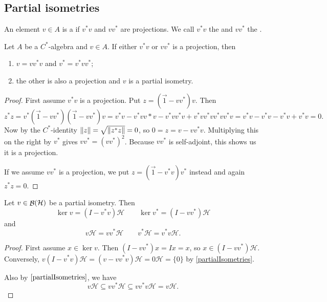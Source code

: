\subsection{Partial isometries}
\begin{definition}
An element $v\in A$ is a  if $v^*v$ and $vv^*$ are projections. We call $v^*v$ the  and $vv^*$ the .
\end{definition}
\begin{lemma} \label{partialIsometries}
Let $A$ be a $C^*$-algebra and $v\in A$.
If either $v^*v$ or $vv^*$ is a projection, then
\begin{enumerate}
\item $v=vv^*v$ and $v^* = v^*vv^*$;
\item the other is also a projection and $v$ is a partial isometry.
\end{enumerate}
\end{lemma}
\begin{proof}
First assume $v^*v$ is a projection. Put $z = (\vec{1}- vv^*)v$. Then
\[ z^*z = v^*(\vec{1}-vv^*)(\vec{1}-vv^*)v = v^*v - v^*vv*v -v^*vv^*v + v^*vv^*vv^*vv^*v = v^*v - v^*v - v^*v + v^*v = 0. \]
Now by the $C^*$-identity $\lVert z\rVert = \sqrt{\lVert z^*z\rVert} = 0$, so $0=z= v - vv^*v$. Multiplying this on the right by $v^*$ gives $vv^* = (vv^*)^2$. Because $vv^*$ is self-adjoint, this shows us it is a projection.

If we assume $vv^*$ is a projection, we put $z = (\vec{1}- v^*v)v^*$ instead and again $z^*z = 0$.
\end{proof}

\begin{lemma}
Let $v\in\mathop{\mathcal{B}}(\mathcal{H})$ be a partial isometry. Then
\[\ker v = (I - v^*v)\mathcal{H} \qquad \ker v^* = (I - vv^*)\mathcal{H}\]
and
\[ v\mathcal{H} = vv^*\mathcal{H} \qquad v^*\mathcal{H} = v^*v\mathcal{H}. \]
\end{lemma}
\begin{proof}
First assume $x\in\ker v$. Then $(I-vv^*)x = Ix = x$, so $x\in (I - vv^*)\mathcal{H}$. Conversely, $v(I-v^*v)\mathcal{H} = (v-vv^*v)\mathcal{H} = 0\mathcal{H} = \{0\}$ by \ref{partialIsometries}.

Also by $\ref{partialIsometries}$, we have
\[ v\mathcal{H} \subseteq vv^*\mathcal{H} \subseteq vv^*v\mathcal{H} = v\mathcal{H}. \]
\end{proof}


